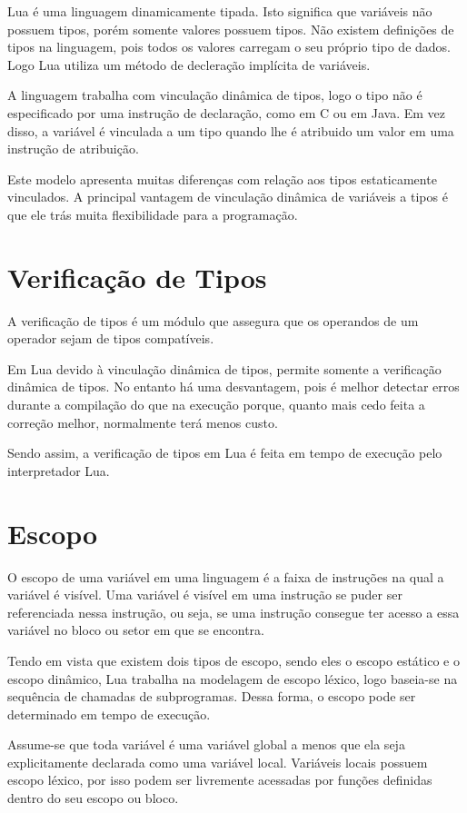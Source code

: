 \documentclass[
12pt, %
openright, %
oneside, %
a4paper, %
english, %
brazil, %
]{abntex2}
\begin{document}
Lua é uma linguagem dinamicamente tipada. Isto significa que variáveis não possuem tipos, porém somente valores possuem tipos. Não existem definições de tipos na linguagem, pois todos os valores carregam o seu próprio tipo de dados. Logo Lua utiliza um método de decleração implícita de variáveis.

A linguagem trabalha com vinculação dinâmica de tipos, logo o tipo não é especificado por uma instrução de declaração, como em C ou em Java. Em vez disso, a variável é vinculada a um tipo quando lhe é atribuido um valor em uma instrução de atribuição.

Este modelo apresenta muitas diferenças com relação aos tipos estaticamente vinculados. A principal vantagem de vinculação dinâmica de variáveis a tipos é que ele trás muita flexibilidade para a programação.

\section{Verificação de Tipos}
A verificação de tipos é um módulo que assegura que os operandos de um operador sejam de tipos compatíveis.

Em Lua devido à vinculação dinâmica de tipos, permite somente a verificação dinâmica de tipos. No entanto há uma desvantagem, pois é melhor detectar erros durante a compilação do que na execução porque, quanto mais cedo feita a correção melhor, normalmente terá menos custo.

Sendo assim, a verificação de tipos em Lua é feita em tempo de execução pelo interpretador Lua.

\section{Escopo}
O escopo de uma variável em uma linguagem é a faixa de instruções na qual a variável é visível. Uma variável é visível em uma instrução se puder ser referenciada nessa instrução, ou seja, se uma instrução consegue ter acesso a essa variável no bloco ou setor em que se encontra.

Tendo em vista que existem dois tipos de escopo, sendo eles o escopo estático e o escopo dinâmico, Lua trabalha na modelagem de escopo léxico, logo baseia-se na sequência de chamadas de subprogramas. Dessa forma, o escopo pode ser determinado em tempo de execução.

Assume-se que toda variável é uma variável global a menos que ela seja explicitamente declarada como uma variável local. Variáveis locais possuem escopo léxico, por isso podem ser livremente acessadas por funções definidas dentro do seu escopo ou bloco.
\end{document}
